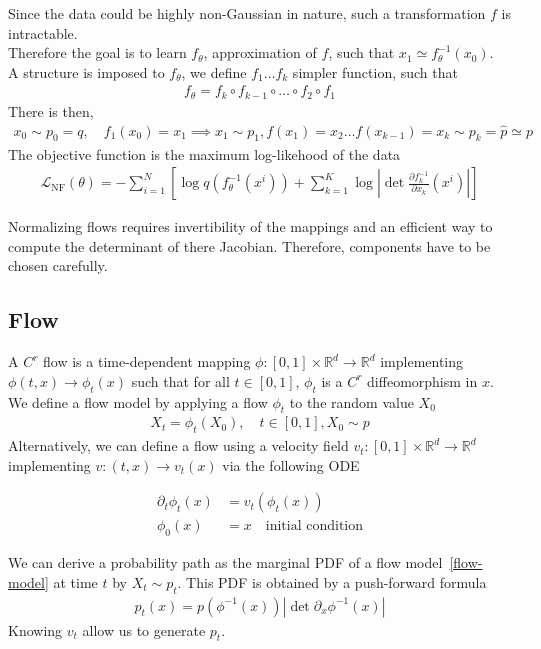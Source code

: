 \documentclass{article}
\begin{document}
Since the data could be highly non-Gaussian in nature, such a transformation $f$ is intractable.\\
Therefore the goal is to learn $f_\theta$, approximation of $f$, such that $x_1 \simeq f_\theta^{-1}(x_0)$. \\
A structure is imposed to $f_\theta$, we define $f_1\ldots f_k$ simpler function,  such that
\begin{align}
    f_\theta = f_k\circ f_{k-1}\circ\ldots\circ f_2\circ f_1
\end{align}
There is then, 
\begin{align}
    x_0\sim p_0=q, \quad f_1(x_0) = x_1 \implies x_1\sim p_1, f(x_1)=x_2 \ldots f(x_{k-1})=x_k \sim p_k = \hat{p} \simeq p
\end{align}
The objective function is the maximum log-likehood of the data
\begin{align}
    \mathcal{L}_\text{NF}(\theta) = -\sum_{i=1}^N \left[ \log q(f_\theta^{-1}(x^i)) + \sum_{k=1}^K \log \left| \det\frac{\partial f_k^{-1}}{\partial x_k}(x^i) \right| \right] 
\end{align}

\bigskip
Normalizing flows requires invertibility of the mappings and an efficient way to compute the determinant of there Jacobian. Therefore, components have to be chosen carefully.

\subsection{Flow}
A $C^r$ flow is a time-dependent mapping $\phi : [0,1]\times \mathbb{R}^d\rightarrow\mathbb{R}^d$ implementing $\phi(t,x) \rightarrow \phi_t(x)$ such that for all $t\in[0,1]$, $\phi_t$ is a $C^r$ diffeomorphism in $x$.
We define a flow model by applying a flow $\phi_t$ to the random value $X_0$
\begin{align}\label{flow-model}
    X_t=\phi_t(X_0), \quad t \in[0,1], X_0\sim p 
\end{align}
Alternatively, we can define a flow using a velocity field \(v_t:[0,1]\times\mathbb{R}^d\rightarrow \mathbb{R}^d\) implementing \(v:(t,x)\rightarrow v_t(x)\) via the following ODE 

\begin{align}\label{ODE}
    \partial_t \phi_t(x)&=v_t(\phi_t(x))\\
    \phi_0(x)&=x \quad \text{initial condition}
\end{align}

We can derive a probability path as the marginal PDF of a flow model~\ref{flow-model} at time \(t\) by \(X_t\sim p_t\). This PDF is obtained by a push-forward formula 
\begin{align}\label{pushforward}
    p_t(x) = p(\phi^{-1}(x))|\det \partial_x \phi^{-1}(x)|
\end{align} 
Knowing \(v_t\) allow us to generate \(p_t\).
\end{document}
